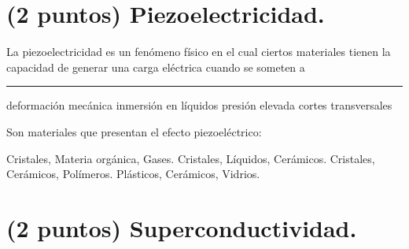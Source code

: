 \documentclass[12pt, letter]{exam}
\begin{document}
\begin{questions}
    
    \section{(2 puntos) Piezoelectricidad.}

    \question La piezoelectricidad es un fenómeno físico en el cual ciertos materiales tienen la capacidad de generar una carga eléctrica cuando se someten a \rule{2cm}{0.1mm}
    \begin{multicols}{2}
    \begin{tasks}
        \task deformación mecánica
        \task inmersión en líquidos
        \task presión elevada
        \task cortes transversales
    \end{tasks}
    \end{multicols}
    \question Son materiales que presentan el efecto piezoeléctrico:
    \begin{multicols}{2}
    \begin{tasks}
        \task Cristales, Materia orgánica, Gases.
        \task Cristales, Líquidos, Cerámicos.
        \task Cristales, Cerámicos, Polímeros.
        \task Plásticos, Cerámicos, Vidrios.
    \end{tasks}
    \end{multicols}

    \section{(2 puntos) Superconductividad.}


\end{questions}
\end{document}
